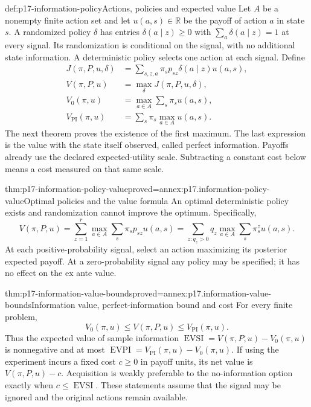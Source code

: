 \begin{hbdefinition}{def:p17-information-policy}{Actions, policies and expected value}
Let \(A\) be a nonempty finite action set and let \(u(a,s)\in\mathbb R\)
be the payoff of action \(a\) in state \(s\).
A randomized policy \(\delta\) has entries \(\delta(a\mid z)\geq0\)
with \(\sum_a\delta(a\mid z)=1\) at every signal.
Its randomization is conditional on the signal, with no additional state
information. A deterministic policy selects one action at each signal.
Define
\[
 \begin{aligned}
 J(\pi,P,u,\delta)
   &=\sum_{s,z,a}\pi_s p_{sz}\delta(a\mid z)u(a,s),\\
 V(\pi,P,u)&=\max_\delta J(\pi,P,u,\delta),\\
 V_0(\pi,u)&=\max_{a\in A}\sum_s\pi_s u(a,s),\\
 V_{\mathrm{PI}}(\pi,u)&=\sum_s\pi_s\max_{a\in A}u(a,s).
 \end{aligned}
\]
The next theorem proves the existence of the first maximum.
The last expression is the value with the state itself observed, called
perfect information.
Payoffs already use the declared expected-utility scale. Subtracting a
constant cost below means a cost measured on that same scale.
\end{hbdefinition}

\begin{hbtheorem}{thm:p17-information-policy-value}{proved=annex:p17.information-policy-value}{Optimal policies and the value formula}
An optimal deterministic policy exists and randomization cannot improve
the optimum. Specifically,
\[
 V(\pi,P,u)
 =\sum_{z=1}^r\max_{a\in A}\sum_s\pi_s p_{sz}u(a,s)
 =\sum_{z:q_z>0}q_z\max_{a\in A}\sum_s\pi^z_s u(a,s).
\]
At each positive-probability signal, select an action maximizing its
posterior expected payoff. At a zero-probability signal any policy may be
specified; it has no effect on the ex ante value.
\end{hbtheorem}

\begin{hbtheorem}{thm:p17-information-value-bounds}{proved=annex:p17.information-value-bounds}{Information value, perfect-information bound and cost}
For every finite problem,
\[
 V_0(\pi,u)\leq V(\pi,P,u)\leq V_{\mathrm{PI}}(\pi,u).
\]
Thus the expected value of sample information
\(\operatorname{EVSI}=V(\pi,P,u)-V_0(\pi,u)\) is nonnegative and at
most \(\operatorname{EVPI}=V_{\mathrm{PI}}(\pi,u)-V_0(\pi,u)\).
If using the experiment incurs a fixed cost \(c\geq0\) in payoff units,
its net value is \(V(\pi,P,u)-c\). Acquisition is weakly preferable to
the no-information option exactly when \(c\leq\operatorname{EVSI}\).
These statements assume that the signal may be ignored and the original
actions remain available.
\end{hbtheorem}

